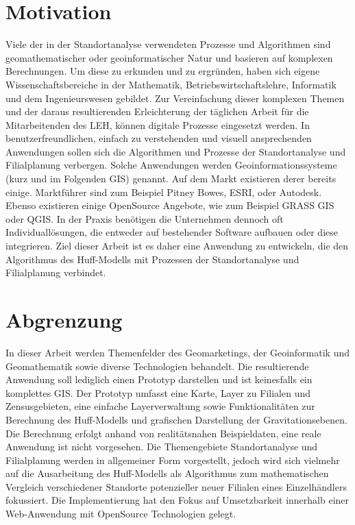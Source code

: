 \section{Motivation}
Viele der in der Standortanalyse verwendeten Prozesse und Algorithmen sind geomathematischer oder geoinformatischer Natur und basieren auf komplexen Berechnungen.
Um diese zu erkunden und zu ergründen, haben sich eigene Wissenschaftsbereiche in der Mathematik, Betriebswirtschaftslehre, Informatik und dem Ingenieurswesen gebildet.
Zur Vereinfachung dieser komplexen Themen und der daraus resultierenden Erleichterung der täglichen Arbeit für die Mitarbeitenden des LEH, können digitale Prozesse eingesetzt werden.
In benutzerfreundlichen, einfach zu verstehenden und visuell ansprechenden Anwendungen sollen sich die Algorithmen und Prozesse der Standortanalyse und Filialplanung verbergen. 
Solche Anwendungen werden Geoinformationssysteme (kurz und im Folgenden GIS) genannt.
Auf dem Markt existieren derer bereits einige.
Marktführer sind zum Beispiel Pitney Bowes, ESRI, oder Autodesk.
Ebenso existieren einige OpenSource Angebote, wie zum Beispiel GRASS GIS oder QGIS.
In der Praxis benötigen die Unternehmen dennoch oft Individuallösungen, die entweder auf bestehender Software aufbauen oder diese integrieren.
Ziel dieser Arbeit ist es daher eine Anwendung zu entwickeln, die den Algorithmus des Huff-Modells mit Prozessen der Standortanalyse und Filialplanung verbindet.


\section{Abgrenzung}
In dieser Arbeit werden Themenfelder des Geomarketings, der Geoinformatik und Geomathematik sowie diverse Technologien behandelt. 
Die resultierende Anwendung soll lediglich einen Prototyp darstellen und ist keinesfalls ein komplettes GIS. 
Der Prototyp umfasst eine Karte, Layer zu Filialen und Zensusgebieten, eine einfache Layerverwaltung sowie Funktionalitäten zur Berechnung des Huff-Modells und grafischen Darstellung der Gravitationsebenen.
Die Berechnung erfolgt anhand von realitätsnahen Beispieldaten, eine reale Anwendung ist nicht vorgesehen. 
Die Themengebiete Standortanalyse und Filialplanung werden in allgemeiner Form vorgestellt, jedoch wird sich vielmehr auf die Ausarbeitung des Huff-Modells als Algorithmus zum mathematischen Vergleich verschiedener Standorte potenzieller neuer Filialen eines Einzelhändlers fokussiert.
Die Implementierung hat den Fokus auf Umsetzbarkeit innerhalb einer Web-Anwendung mit OpenSource Technologien gelegt. 